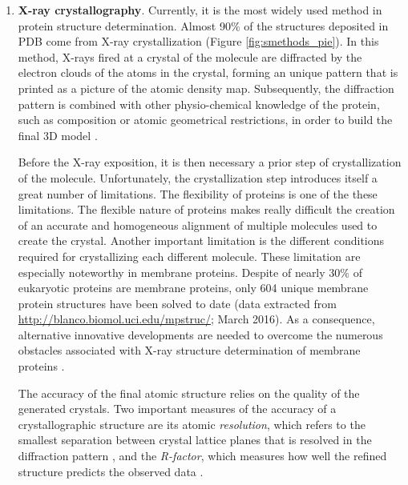 \documentclass[12pt, a4paper,twoside]{tesi_upf}
\begin{document}
\begin{enumerate}[label=(\alph*)]
\item \textbf{X-ray crystallography}. Currently, it is the most widely used method in protein structure determination. Almost 90$\%$ of the structures deposited in PDB come from X-ray crystallization (Figure \ref{fig:smethods_pie}). In this method, X-rays fired at a crystal of the molecule are diffracted by the electron clouds of the atoms in the crystal, forming an unique pattern that is printed as a picture of the atomic density map. Subsequently, the diffraction pattern is combined with other physio-chemical knowledge of the protein, such as composition or atomic geometrical restrictions, in order to build the final 3D model \cite{Smyth2000}. 
\par Before the X-ray exposition, it is then necessary a prior step of crystallization of the molecule.  Unfortunately, the crystallization step introduces itself a great number of limitations.  The flexibility of proteins is one of the these limitations. The flexible nature of proteins makes really difficult the creation of an accurate and homogeneous alignment of multiple molecules used to create the crystal. Another important limitation is the different conditions required for crystallizing each different molecule. These limitation are especially noteworthy in membrane proteins. Despite of nearly 30$\%$ of eukaryotic proteins are membrane proteins, only 604 unique membrane protein structures have been solved to date (data extracted from \url{http://blanco.biomol.uci.edu/mpstruc/}; March 2016). As a consequence, alternative innovative developments are needed to overcome the numerous obstacles associated with X-ray structure determination of membrane proteins \cite{Bill2011}. 
\par The accuracy of the final atomic structure relies on the quality of the generated crystals. Two important measures of the accuracy of a crystallographic structure are its atomic \textit{resolution}, which refers to the smallest separation between crystal lattice planes that is resolved in the diffraction pattern \cite{Yaffe2005}, and the \textit{R-factor}, which measures how well the refined structure predicts the observed data \cite{Morris1992}. 


\end{enumerate}
\end{document}
